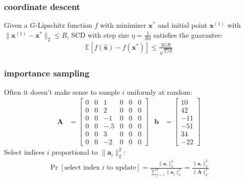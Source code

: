 \documentclass[compress]{beamer}
\newcommand{\bv}[1]{\mathbf{#1}}
\newcommand{\E}{\mathbb{E}}
\begin{document}
\begin{frame}[t]
	\frametitle{coordinate descent}
	\begin{theorem}
		Given a $G$-Lipschitz function $f$ with minimizer $\bv{x}^*$ and initial point $\bv{x}^{(1)} $ with $\|\bv{x}^{(1)} - \bv{x}^*\|_2 \leq R$, SCD with step size $\eta = \frac{1}{Rd}$ satisfies the guarantee:
		\begin{align*}
		\E[f(\hat{\bv{x}}) - f({\bv{x}^*})] \leq \frac{2GR}{\sqrt{T/d}}
		\end{align*}
	\end{theorem}
\end{frame}

\begin{frame}[t]
	\frametitle{importance sampling}
	Often it doesn't make sense to sample $i$ uniformly at random:
	\begin{align*}
	\bv{A} &= \begin{bmatrix} 
	0 & 0 & 1 & 0 & 0 & 0 \\
	0 & 0 & 2 & 0 & 0 & 0 \\
	0 & 0 & -1 & 0 & 0 & 0 \\
	0 & 0 & -.5 & 0 & 0 & 0 \\
	0 & 0 & 3 & 0 & 0 & 0 \\
	0 & 0 & -2 & 0 & 0 & 0 
	\end{bmatrix} & 
	\bv{b} &=\begin{bmatrix} 
	 10  \\
	 42 \\
	-11  \\
	 -51 \\
	34\\
	-22 
	\end{bmatrix} 
	\end{align*}
	Select indices $i$ proportional to $\|\bv{a}_i\|_2^2$:
	\begin{align*}
		\Pr[\text{select index $i$ to update}] = \frac{\|\bv{a}_i\|_2^2}{\sum_{j=1}^d \|\bv{a}_j\|_2^2} = \frac{\|\bv{a}_i\|_2^2}{\|\bv{A}\|_2^2} 
	\end{align*}
\end{frame}
\end{document}
